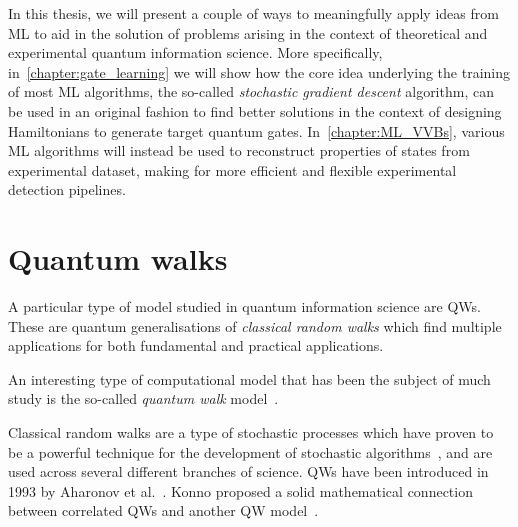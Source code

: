 In this thesis, we will present a couple of ways to meaningfully apply ideas from ML to aid in the solution of problems arising in the context of theoretical and experimental quantum information science.
More specifically, in~\cref{chapter:gate_learning} we will show how the core idea underlying the training of most ML algorithms, the so-called \emph{stochastic gradient descent} algorithm, can be used in an original fashion to find better solutions in the context of designing Hamiltonians to generate target quantum gates.
In~\cref{chapter:ML_VVBs}, various ML algorithms will instead be used to reconstruct properties of states from experimental dataset, making for more efficient and flexible experimental detection pipelines.


\section{Quantum walks}
\label{sec:intro:QWs}

A particular type of model studied in quantum information science are \acfp{QW}.
These are quantum generalisations of \emph{classical random walks} which find multiple applications for both fundamental and practical applications.

An interesting type of computational model that has been the subject of much study is the so-called \textit{quantum walk} model~\cite{aharonov2000quantum,kempe2003quantum,venegasandraca2012quantum,portugal2013quantum}.

Classical random walks are a type of stochastic processes which have proven to be a powerful technique for the development of stochastic algorithms~\cite{motwani1995randomized,schoning1999probabilistic}, and are used across several different branches of science.
\acp{QW} have been introduced in 1993 by Aharonov et al.~\cite{aharonov1993quantum}.
Konno proposed a solid mathematical connection between correlated \acp{QW} and another QW model~\cite{konno2003limit}.


